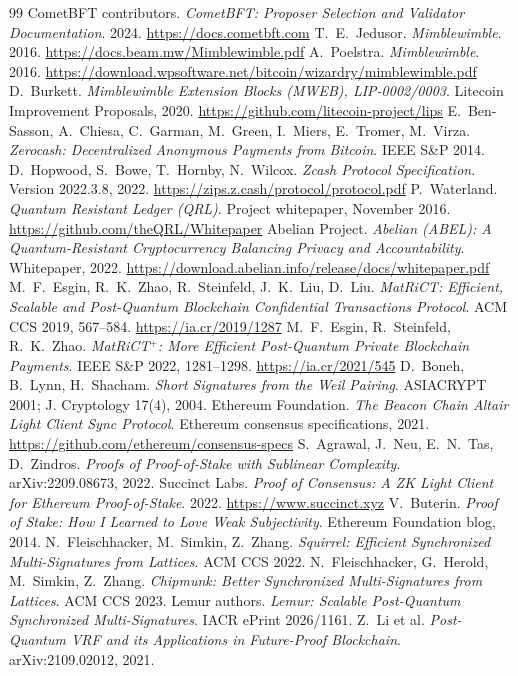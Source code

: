 \documentclass[11pt]{article}
\theoremstyle{plain}
\theoremstyle{definition}
\theoremstyle{remark}
\begin{document}
\begin{thebibliography}{99}
 CometBFT contributors. \emph{CometBFT: Proposer Selection and Validator Documentation}. 2024. \url{https://docs.cometbft.com}
 T.~E.~Jedusor. \emph{Mimblewimble}. 2016. \url{https://docs.beam.mw/Mimblewimble.pdf}
 A.~Poelstra. \emph{Mimblewimble}. 2016. \url{https://download.wpsoftware.net/bitcoin/wizardry/mimblewimble.pdf}
 D.~Burkett. \emph{Mimblewimble Extension Blocks (MWEB), LIP-0002/0003}. Litecoin Improvement Proposals, 2020. \url{https://github.com/litecoin-project/lips}
 E.~Ben-Sasson, A.~Chiesa, C.~Garman, M.~Green, I.~Miers, E.~Tromer, M.~Virza. \emph{Zerocash: Decentralized Anonymous Payments from Bitcoin}. IEEE S\&P 2014.
 D.~Hopwood, S.~Bowe, T.~Hornby, N.~Wilcox. \emph{Zcash Protocol Specification}. Version 2022.3.8, 2022. \url{https://zips.z.cash/protocol/protocol.pdf}
 P.~Waterland. \emph{Quantum Resistant Ledger (QRL)}. Project whitepaper, November 2016. \url{https://github.com/theQRL/Whitepaper}
 Abelian Project. \emph{Abelian (ABEL): A Quantum-Resistant Cryptocurrency Balancing Privacy and Accountability}. Whitepaper, 2022. \url{https://download.abelian.info/release/docs/whitepaper.pdf}
 M.~F.~Esgin, R.~K.~Zhao, R.~Steinfeld, J.~K.~Liu, D.~Liu. \emph{MatRiCT: Efficient, Scalable and Post-Quantum Blockchain Confidential Transactions Protocol}. ACM CCS 2019, 567--584. \url{https://ia.cr/2019/1287}
 M.~F.~Esgin, R.~Steinfeld, R.~K.~Zhao. \emph{MatRiCT$^{+}$: More Efficient Post-Quantum Private Blockchain Payments}. IEEE S\&P 2022, 1281--1298. \url{https://ia.cr/2021/545}
 D.~Boneh, B.~Lynn, H.~Shacham. \emph{Short Signatures from the Weil Pairing}. ASIACRYPT 2001; J. Cryptology 17(4), 2004.
 Ethereum Foundation. \emph{The Beacon Chain Altair Light Client Sync Protocol}. Ethereum consensus specifications, 2021. \url{https://github.com/ethereum/consensus-specs}
 S.~Agrawal, J.~Neu, E.~N.~Tas, D.~Zindros. \emph{Proofs of Proof-of-Stake with Sublinear Complexity}. arXiv:2209.08673, 2022.
 Succinct Labs. \emph{Proof of Consensus: A ZK Light Client for Ethereum Proof-of-Stake}. 2022. \url{https://www.succinct.xyz}
 V.~Buterin. \emph{Proof of Stake: How I Learned to Love Weak Subjectivity}. Ethereum Foundation blog, 2014.
 N.~Fleischhacker, M.~Simkin, Z.~Zhang. \emph{Squirrel: Efficient Synchronized Multi-Signatures from Lattices}. ACM CCS 2022.
 N.~Fleischhacker, G.~Herold, M.~Simkin, Z.~Zhang. \emph{Chipmunk: Better Synchronized Multi-Signatures from Lattices}. ACM CCS 2023.
 Lemur authors. \emph{Lemur: Scalable Post-Quantum Synchronized Multi-Signatures}. IACR ePrint 2026/1161.
 Z.~Li et al. \emph{Post-Quantum VRF and its Applications in Future-Proof Blockchain}. arXiv:2109.02012, 2021.

\end{thebibliography}
\end{document}
